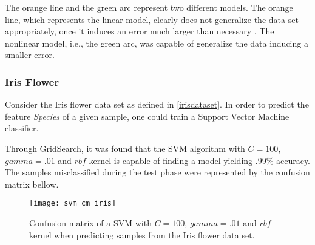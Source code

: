 The orange line and the green arc represent two different models. The orange line, which represents the linear model, clearly does not generalize the data set appropriately, once it induces an error much larger than necessary \cite{roh2015}. The nonlinear model, i.e., the green arc, was capable of generalize the data inducing a smaller error.

\subsubsection{Iris Flower}

Consider the Iris flower data set as defined in \ref{irisdataset}. In order to predict the feature {\em Species} of a given sample, one could train a Support Vector Machine classifier.

Through GridSearch, it was found that the SVM algorithm with $C=100$, $gamma=.01$ and $rbf$ kernel is capable of finding a model yielding .99\% accuracy. The samples misclassified during the test phase were represented by the confusion matrix bellow.

\begin{figure}[H]
	\centering
	\captionsetup{justification=centering}

	\texttt{[image: svm\_cm\_iris]}
	\caption{Confusion matrix of a SVM with $C=100$, $gamma=.01$ and $rbf$ kernel when predicting samples from the Iris flower data set.}
	\label{fig:cmsvmiris}
\end{figure}
